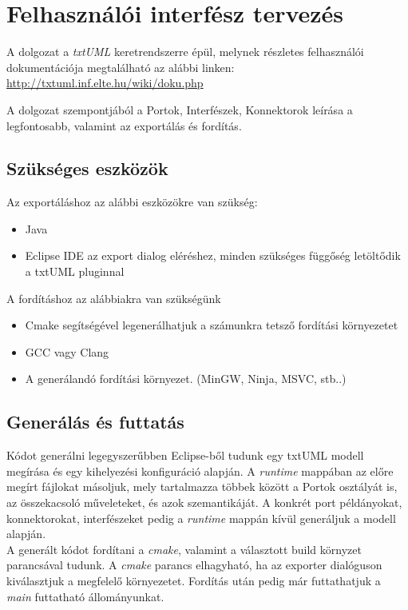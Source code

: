 \documentclass[a4paper,12pt]{report}
\begin{document}
\section{Felhasználói interfész tervezés}
A dolgozat a \textit{txtUML} keretrendszerre épül, melynek részletes felhasználói dokumentációja megtalálható az alábbi linken: \url{http://txtuml.inf.elte.hu/wiki/doku.php}

A dolgozat szempontjából a Portok, Interfészek, Konnektorok leírása a legfontosabb, valamint az exportálás és fordítás.

\subsection{Szükséges eszközök}
Az exportáláshoz az alábbi eszközökre van szükség:
\begin{itemize}
\item Java
\item Eclipse IDE az export dialog eléréshez, minden szükséges függőség letöltődik a txtUML pluginnal
\end{itemize}

A fordításhoz az alábbiakra van szükségünk
\begin{itemize}
\item Cmake segítségével legenerálhatjuk a számunkra tetsző fordítási környezetet
\item GCC vagy Clang
\item A generálandó fordítási környezet. (MinGW, Ninja, MSVC, stb..)
\end{itemize}

\subsection{Generálás és futtatás}
Kódot generálni legegyszerűbben Eclipse-ből tudunk egy txtUML modell megírása és egy kihelyezési konfiguráció alapján. A \textit{runtime} mappában az előre megírt fájlokat másoljuk, mely tartalmazza többek között a Portok osztályát is, az összekacsoló műveleteket, és azok szemantikáját. A konkrét port példányokat, konnektorokat, interfészeket pedig a \textit{runtime} mappán kívül generáljuk a modell alapján. \\

A generált kódot fordítani a \textit{cmake}, valamint a választott build környzet parancsával tudunk. A \textit{cmake} parancs elhagyható, ha az exporter dialóguson kiválasztjuk a megfelelő környezetet. Fordítás után pedig már futtathatjuk a \textit{main} futtatható állományunkat.
\end{document}
